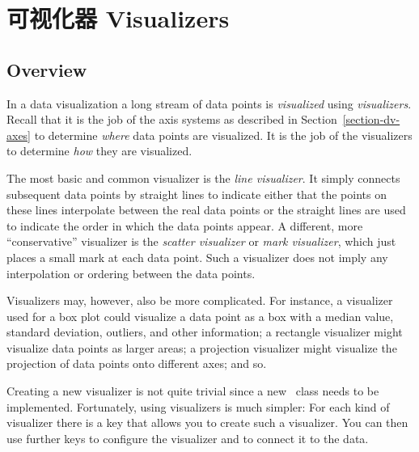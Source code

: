 %
%
%


\section{可视化器 Visualizers}
\label{section-dv-visualizers}

\subsection{Overview}

In a data visualization a long stream of data points is \emph{visualized} using
\emph{visualizers}. Recall that it is the job of the axis systems as described
in Section~\ref{section-dv-axes} to determine \emph{where} data points are
visualized. It is the job of the visualizers to determine \emph{how} they are
visualized.

The most basic and common visualizer is the \emph{line visualizer}. It simply
connects subsequent data points by straight lines to indicate either that the
points on these lines interpolate between the real data points or the straight
lines are used to indicate the order in which the data points appear. A
different, more ``conservative'' visualizer is the \emph{scatter visualizer} or
\emph{mark visualizer}, which just places a small mark at each data point. Such
a visualizer does not imply any interpolation or ordering between the data
points.

Visualizers may, however, also be more complicated. For instance, a visualizer
used for a box plot could visualize a data point as a box with a median value,
standard deviation, outliers, and other information; a rectangle visualizer
might visualize data points as larger areas; a projection visualizer might
visualize the projection of data points onto different axes; and so.

Creating a new visualizer is not quite trivial since a new \pgfname\ class
needs to be implemented. Fortunately, using visualizers is much simpler: For
each kind of visualizer there is a key that allows you to create such a
visualizer. You can then use further keys to configure the visualizer and to
connect it to the data.

